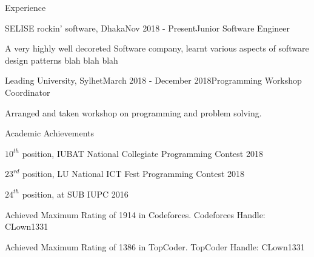 \documentclass{resume}
\begin{document}

\begin{rSection}{Experience}

\begin{rSubsection}{SELISE rockin' software, Dhaka}{Nov 2018 - Present}{Junior Software Engineer}{}
\item A very highly well decoreted Software company, learnt various aspects of software design patterns blah blah blah
\end{rSubsection}

\begin{rSubsection}{Leading University, Sylhet}{March 2018 - December 2018}{Programming Workshop Coordinator}{}
\item Arranged and taken workshop on programming and problem solving.
\end{rSubsection}


\end{rSection}



\begin{rSection}{Academic Achievements} 
\item $10^{th}$ position, IUBAT National Collegiate Programming Contest 2018
\item $23^{rd}$ position, LU National ICT Fest Programming Contest 2018
\item $24^{th}$ position, at SUB IUPC 2016
\item Achieved Maximum Rating of 1914 in Codeforces.  Codeforces Handle: CLown1331
\item Achieved Maximum Rating of 1386 in TopCoder. TopCoder Handle: CLown1331

\end{rSection}
\end{document}
